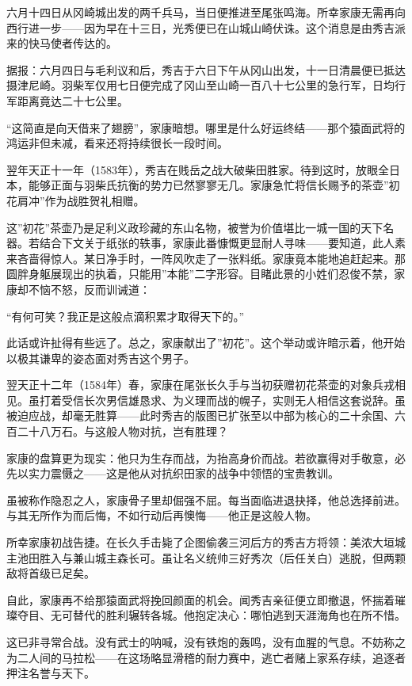 \documentclass[
]{book}
\begin{document}
六月十四日从冈崎城出发的两千兵马，当日便推进至尾张鸣海。所幸家康无需再向西行进一步------因为早在十三日，光秀便已在山城山崎伏诛。这个消息是由秀吉派来的快马使者传达的。

据报：六月四日与毛利议和后，秀吉于六日下午从冈山出发，十一日清晨便已抵达摄津尼崎。羽柴军仅用七日便完成了冈山至山崎一百八十七公里的急行军，日均行军距离竟达二十七公里。

``这简直是向天借来了翅膀''，家康暗想。哪里是什么好运终结------那个猿面武将的鸿运非但未减，看来还将持续很长一段时间。

翌年天正十一年（1583年），秀吉在贱岳之战大破柴田胜家。待到这时，放眼全日本，能够正面与羽柴氏抗衡的势力已然寥寥无几。家康急忙将信长赐予的茶壶''初花肩冲''作为战胜贺礼相赠。

这''初花''茶壶乃是足利义政珍藏的东山名物，被誉为价值堪比一城一国的天下名器。若结合下文关于纸张的轶事，家康此番慷慨更显耐人寻味------要知道，此人素来吝啬得惊人。某日净手时，一阵风吹走了一张料纸。家康竟本能地追赶起来。那圆胖身躯展现出的执着，只能用''本能''二字形容。目睹此景的小姓们忍俊不禁，家康却不恼不怒，反而训诫道：

``有何可笑？我正是这般点滴积累才取得天下的。''

此话或许扯得有些远了。总之，家康献出了''初花''。这个举动或许暗示着，他开始以极其谦卑的姿态面对秀吉这个男子。

翌天正十二年（1584年）春，家康在尾张长久手与当初获赠初花茶壶的对象兵戎相见。虽打着受信长次男信雄恳求、为义理而战的幌子，实则无人相信这套说辞。虽被迫应战，却毫无胜算------此时秀吉的版图已扩张至以中部为核心的二十余国、六百二十八万石。与这般人物对抗，岂有胜理？

家康的盘算更为现实：他只为生存而战，为抬高身价而战。若欲赢得对手敬意，必先以实力震慑之------这是他从对抗织田家的战争中领悟的宝贵教训。

虽被称作隐忍之人，家康骨子里却倔强不屈。每当面临进退抉择，他总选择前进。与其无所作为而后悔，不如行动后再懊悔------他正是这般人物。

所幸家康初战告捷。在长久手击毙了企图偷袭三河后方的秀吉方将领：美浓大垣城主池田胜入与兼山城主森长可。虽让名义统帅三好秀次（后任关白）逃脱，但两颗敌将首级已足矣。

自此，家康再不给那猿面武将挽回颜面的机会。闻秀吉亲征便立即撤退，怀揣着璀璨夺目、无可替代的胜利辗转各城。他抱定决心：哪怕逃到天涯海角也在所不惜。

这已非寻常合战。没有武士的呐喊，没有铁炮的轰鸣，没有血腥的气息。不妨称之为二人间的马拉松------在这场略显滑稽的耐力赛中，逃亡者赌上家系存续，追逐者押注名誉与天下。
\end{document}
